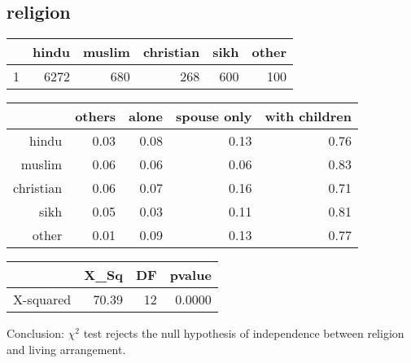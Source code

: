\documentclass[11pt]{article}
\begin{document}
\subsection*{religion}
\begin{table}[ht]
\centering
\begin{tabular}{rrrrrr}
  \hline
 & hindu & muslim & christian & sikh & other \\ 
  \hline
1 & 6272 & 680 & 268 & 600 & 100 \\ 
   \hline
\end{tabular}
\end{table}%
\begin{table}[ht]
\centering
\begin{tabular}{rrrrr}
  \hline
 & others & alone & spouse only & with children \\ 
  \hline
hindu & 0.03 & 0.08 & 0.13 & 0.76 \\ 
  muslim & 0.06 & 0.06 & 0.06 & 0.83 \\ 
  christian & 0.06 & 0.07 & 0.16 & 0.71 \\ 
  sikh & 0.05 & 0.03 & 0.11 & 0.81 \\ 
  other & 0.01 & 0.09 & 0.13 & 0.77 \\ 
   \hline
\end{tabular}
\end{table}%
\begin{table}[ht]
\centering
\begin{tabular}{rrrr}
  \hline
 & X\_Sq & DF & pvalue \\ 
  \hline
X-squared & 70.39 & 12 & 0.0000 \\ 
   \hline
\end{tabular}
\end{table}Conclusion: $\chi^2$ test rejects the null hypothesis of independence between religion and living arrangement. 

\newpage
\end{document}
